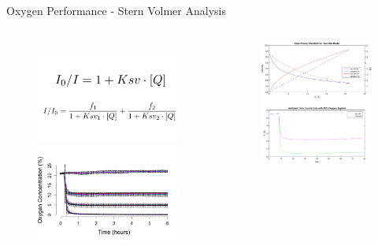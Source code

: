 \documentclass{beamer}
\begin{document}
\begin{frame}{Oxygen Performance - Stern Volmer Analysis}
\begin{columns}
\begin{figure}
\includegraphics[width=.6\linewidth]{images/stern-volmer-equ.png}\\
\includegraphics[width=1\linewidth]{images/oxygen-time.png}
\end{figure}
\begin{figure}
\includegraphics[width=.8\linewidth]{images/stern-volmer-plots.png}
 \end{figure}
\end{columns}
\end{frame}
\end{document}
